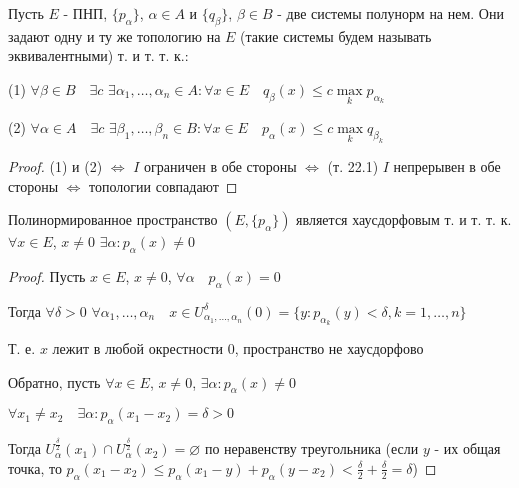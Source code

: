 \documentclass[a4paper,12pt]{report}
\begin{document}
\begin{cons}
Пусть $E$ - ПНП, $\{p_\alpha\}$, $\alpha\in A$ и $\{q_\beta\}$, $\beta\in B$ - две системы полунорм на нем. Они задают одну и ту же топологию на $E$ (такие системы будем называть эквивалентными) т. и т. т. к.:

(1) $\forall\beta\in B\quad\exists c$ $\exists\alpha_1,\ldots,\alpha_n\in A\colon\forall x\in E\quad q_\beta(x)\le c\max\limits_k p_{\alpha_k}$

(2) $\forall\alpha\in A\quad\exists c$ $\exists\beta_1,\ldots,\beta_n\in B\colon\forall x\in E\quad p_\alpha(x)\le c\max\limits_k q_{\beta_k}$
\end{cons}
\begin{proof}
(1) и (2) $\Leftrightarrow$ $I$ ограничен в обе стороны $\Leftrightarrow$ (т. 22.1) $I$ непрерывен в обе стороны $\Leftrightarrow$ топологии совпадают
\end{proof}
 


\begin{lem}
Полинормированное пространство $\left(E,\{p_\alpha\}\right)$ является хаусдорфовым т. и т. т. к. $\forall x\in E$, $x\ne0$ $\exists\alpha\colon p_\alpha(x)\ne0$
\end{lem}
\begin{proof}
Пусть $x\in E$, $x\ne0$, $\forall\alpha\quad p_\alpha(x)=0$

Тогда $\forall\delta>0$ $\forall\alpha_1,\ldots,\alpha_n\quad x\in U_{\alpha_1,\ldots,\alpha_n}^\delta(0)=\{y\colon p_{\alpha_k}(y)<\delta,\!k=1,\ldots,n\}$

Т. е. $x$ лежит в любой окрестности 0, пространство не хаусдорфово

Обратно, пусть $\forall x\in E$, $x\ne0$, $\exists\alpha\colon p_\alpha(x)\ne0$

$\forall x_1\ne x_2\quad\exists\alpha\colon p_\alpha(x_1-x_2)=\delta>0$

Тогда $U_\alpha^{\frac\delta2}(x_1)\cap U_\alpha^{\frac\delta2}(x_2)=\varnothing$ по неравенству треугольника (если $y$ - их общая точка, то $p_\alpha(x_1-x_2)\le p_\alpha(x_1-y)+p_\alpha(y-x_2)<\frac\delta2+\frac\delta2=\delta$)
\end{proof}
 
\end{document}
